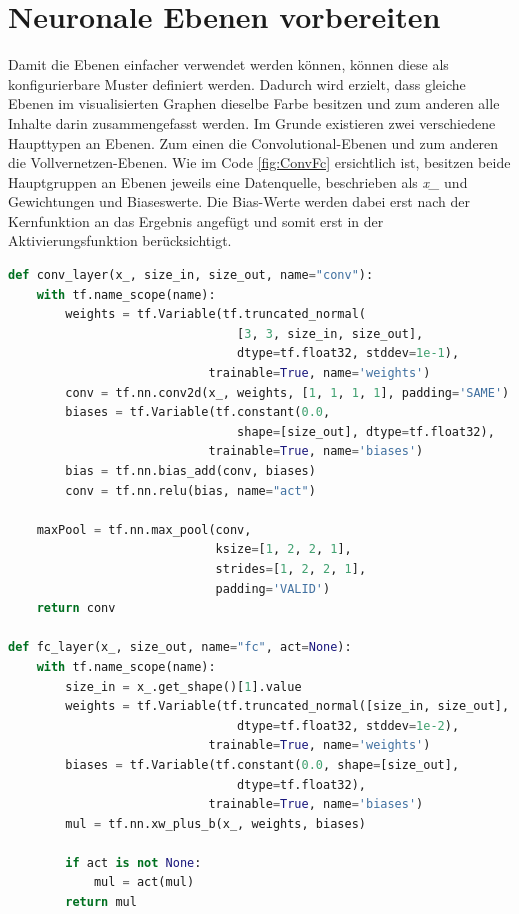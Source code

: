 \section{Neuronale Ebenen vorbereiten}

Damit die Ebenen einfacher verwendet werden können, können diese als konfigurierbare Muster definiert werden. 
Dadurch wird erzielt, dass gleiche Ebenen im visualisierten Graphen dieselbe Farbe besitzen und zum anderen alle Inhalte darin zusammengefasst werden. 
Im Grunde existieren zwei verschiedene Haupttypen an Ebenen. 
Zum einen die Convolutional-Ebenen und zum anderen die Vollvernetzen-Ebenen. 
Wie im Code \ref{fig:ConvFc} ersichtlich ist, besitzen beide Hauptgruppen an Ebenen jeweils eine Datenquelle, beschrieben als \textit{x\_} und Gewichtungen und Biaseswerte. 
Die Bias-Werte werden dabei erst nach der Kernfunktion an das Ergebnis angefügt und somit erst in der Aktivierungsfunktion berücksichtigt. 
\begin{lstlisting}[caption={Definition der Convolutional- und Vollvernetzen-Ebenen},label=fig:ConvFc,captionpos=b,language=Python]
def conv_layer(x_, size_in, size_out, name="conv"):
    with tf.name_scope(name):
        weights = tf.Variable(tf.truncated_normal(
        						[3, 3, size_in, size_out], 
        						dtype=tf.float32, stddev=1e-1), 
							trainable=True, name='weights')
        conv = tf.nn.conv2d(x_, weights, [1, 1, 1, 1], padding='SAME')
        biases = tf.Variable(tf.constant(0.0, 
								shape=[size_out], dtype=tf.float32), 
                            trainable=True, name='biases')
        bias = tf.nn.bias_add(conv, biases)
        conv = tf.nn.relu(bias, name="act")

    maxPool = tf.nn.max_pool(conv, 
                             ksize=[1, 2, 2, 1],
                             strides=[1, 2, 2, 1],
                             padding='VALID')
    return conv

def fc_layer(x_, size_out, name="fc", act=None):
    with tf.name_scope(name):
        size_in = x_.get_shape()[1].value
        weights = tf.Variable(tf.truncated_normal([size_in, size_out], 
								dtype=tf.float32, stddev=1e-2), 
							trainable=True, name='weights')
        biases = tf.Variable(tf.constant(0.0, shape=[size_out], 
								dtype=tf.float32), 
							trainable=True, name='biases')
        mul = tf.nn.xw_plus_b(x_, weights, biases)
        
        if act is not None:
            mul = act(mul)
        return mul
\end{lstlisting}


